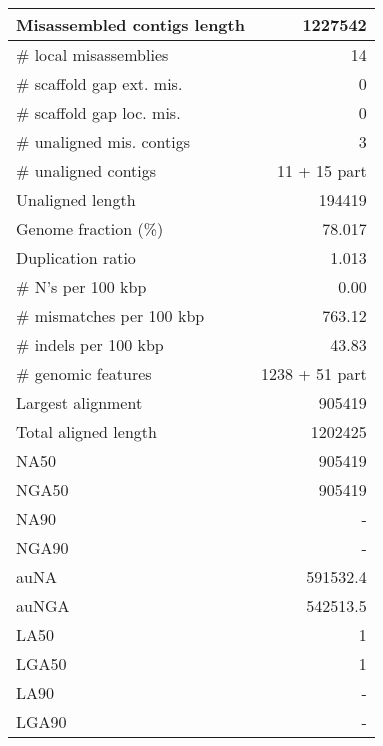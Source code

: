 \documentclass[12pt,a4paper]{article}
\begin{document}
\begin{table}[ht]
\begin{center}
\begin{tabular}{|l*{1}{|r}|}
Misassembled contigs length & 1227542 \\ \hline
\# local misassemblies & 14 \\ \hline
\# scaffold gap ext. mis. & 0 \\ \hline
\# scaffold gap loc. mis. & 0 \\ \hline
\# unaligned mis. contigs & 3 \\ \hline
\# unaligned contigs & 11 + 15 part \\ \hline
Unaligned length & 194419 \\ \hline
Genome fraction (\%) & 78.017 \\ \hline
Duplication ratio & 1.013 \\ \hline
\# N's per 100 kbp & 0.00 \\ \hline
\# mismatches per 100 kbp & 763.12 \\ \hline
\# indels per 100 kbp & 43.83 \\ \hline
\# genomic features & 1238 + 51 part \\ \hline
Largest alignment & 905419 \\ \hline
Total aligned length & 1202425 \\ \hline
NA50 & 905419 \\ \hline
NGA50 & 905419 \\ \hline
NA90 & - \\ \hline
NGA90 & - \\ \hline
auNA & 591532.4 \\ \hline
auNGA & 542513.5 \\ \hline
LA50 & 1 \\ \hline
LGA50 & 1 \\ \hline
LA90 & - \\ \hline
LGA90 & - \\ \hline
\end{tabular}
\end{center}
\end{table}
\end{document}
